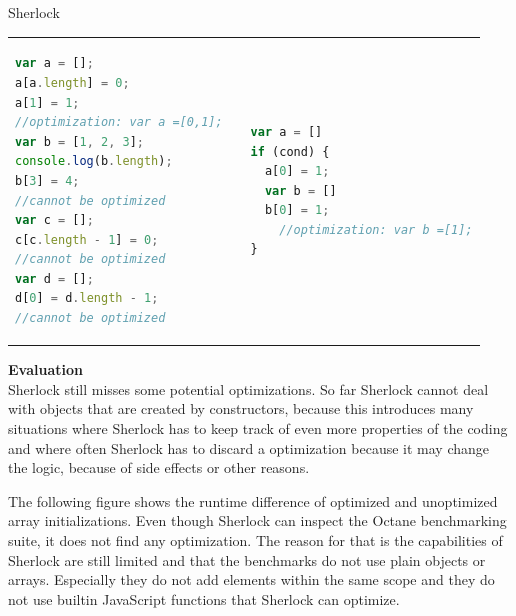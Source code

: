 \documentclass[a1paper,portrait,fontscale=0.418]{baposter}
\begin{document}
\begin{poster}
\begin{posterbox}[name=results1,span=2,column=1,row=0]{Sherlock}
\begin{center}
\begin{tabular}{|l l |l }
\begin{lstlisting}[language=Javascript]
var a = [];
a[a.length] = 0;
a[1] = 1;
//optimization: var a =[0,1];
var b = [1, 2, 3];
console.log(b.length);
b[3] = 4;
//cannot be optimized
var c = [];
c[c.length - 1] = 0;
//cannot be optimized
var d = [];
d[0] = d.length - 1;
//cannot be optimized
\end{lstlisting}
& &
\begin{lstlisting}[language=Javascript]
var a = []
if (cond) {
  a[0] = 1;
  var b = []
  b[0] = 1;
	//optimization: var b =[1];
}
\end{lstlisting} 
\end{tabular}
\setlength{\tabcolsep}{12em}
\end{center}

\textbf{Evaluation} \\ 
Sherlock still misses some potential optimizations. So far Sherlock cannot deal with objects that are created by constructors, because this introduces many situations where Sherlock has to keep track of even more properties of the coding and where often Sherlock has to discard a optimization because it may change the logic, because of side effects or other reasons.

The following figure shows the runtime difference of optimized and unoptimized array initializations. Even though Sherlock can inspect the Octane benchmarking suite, it does not find any optimization. The reason for that is the capabilities of Sherlock are still limited and that the benchmarks do not use plain objects or arrays. Especially they do not add elements within the same scope and they do not use builtin JavaScript functions that Sherlock can optimize.


 
\begin{center}
\end{center}
\end{posterbox}
\end{poster}
\end{document}
